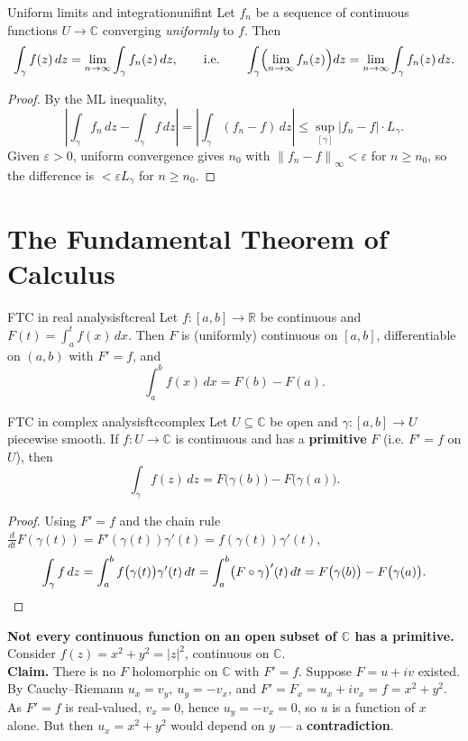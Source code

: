 \documentclass[11pt,openany]{report}
\newcommand{\C}{\mathbb{C}}
\newcommand{\R}{\mathbb{R}}
\newcommand{\abs}[1]{\left\lvert #1 \right\rvert}
\newcommand{\norm}[1]{\left\lVert #1 \right\rVert}
\newcommand{\eps}{\varepsilon}
\begin{document}
\begin{corollary}{Uniform limits and integration}{unifint}
Let $f_n$ be a sequence of continuous functions $U\to\C$ converging \emph{uniformly} to
$f$. Then
\[
  \int_\gamma f(z)\,dz = \lim_{n\to\infty}\int_\gamma f_n(z)\,dz,
  \qquad\text{i.e.}\qquad \int_\gamma \Bigl(\lim_{n\to\infty} f_n(z)\Bigr)dz = \lim_{n\to\infty}\int_\gamma f_n(z)\,dz .
\]
\end{corollary}

\begin{proof}
By the ML inequality,
\[
  \left\lvert\int_\gamma f_n\,dz - \int_\gamma f\,dz\right\rvert
  = \left\lvert\int_\gamma (f_n-f)\,dz\right\rvert
  \le \sup_{[\gamma]}\abs{f_n-f}\cdot L_\gamma .
\]
Given $\eps>0$, uniform convergence gives $n_0$ with $\norm{f_n-f}_\infty<\eps$ for
$n\ge n_0$, so the difference is $<\eps L_\gamma$ for $n\ge n_0$.
\end{proof}

\section{The Fundamental Theorem of Calculus}

\begin{theorem}{FTC in real analysis}{ftcreal}
Let $f:[a,b]\to\R$ be continuous and $F(t)=\int_a^t f(x)\,dx$. Then $F$ is (uniformly)
continuous on $[a,b]$, differentiable on $(a,b)$ with $F'=f$, and
\[
  \int_a^b f(x)\,dx = F(b) - F(a) .
\]
\end{theorem}

\begin{theorem}{FTC in complex analysis}{ftccomplex}
Let $U\subseteq\C$ be open and $\gamma:[a,b]\to U$ piecewise smooth. If $f:U\to\C$ is
continuous and has a \textbf{primitive} $F$ (i.e. $F'=f$ on $U$), then
\[
  \int_\gamma f(z)\,dz = F\bigl(\gamma(b)\bigr) - F\bigl(\gamma(a)\bigr).
\]
\end{theorem}

\begin{proof}
Using $F'=f$ and the chain rule $\frac{d}{dt}F(\gamma(t))=F'(\gamma(t))\gamma'(t)=f(\gamma(t))\gamma'(t)$,
\[
  \int_\gamma f\,dz = \int_a^b f\bigl(\gamma(t)\bigr)\gamma'(t)\,dt
  = \int_a^b \bigl(F\circ\gamma\bigr)'(t)\,dt
  = F\bigl(\gamma(b)\bigr) - F\bigl(\gamma(a)\bigr). \qedhere
\]
\end{proof}

\begin{caution}
\textbf{Not every continuous function on an open subset of $\C$ has a primitive.} Consider
$f(z)=x^2+y^2=\abs{z}^2$, continuous on $\C$.\\[3pt]
\textbf{Claim.} There is no $F$ holomorphic on $\C$ with $F'=f$. Suppose $F=u+iv$ existed.
By Cauchy--Riemann $u_x=v_y,\ u_y=-v_x$, and $F'=F_x=u_x+iv_x=f=x^2+y^2$. As $F'=f$ is
real-valued, $v_x=0$, hence $u_y=-v_x=0$, so $u$ is a function of $x$ alone. But then
$u_x=x^2+y^2$ would depend on $y$ --- a \textbf{contradiction}.
\end{caution}
\end{document}
